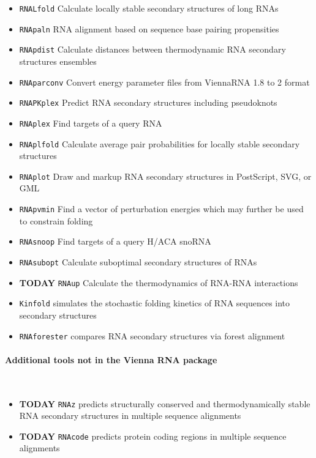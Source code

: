 \documentclass[]{article}
\let\oldparagraph\paragraph
\renewcommand{\paragraph}[1]{\oldparagraph{#1}\mbox{}}
\begin{document}
\begin{itemize}
\item \texttt{RNALfold} Calculate locally stable secondary structures of long RNAs\\
\item \texttt{RNApaln} RNA alignment based on sequence base pairing propensities\\
\item \texttt{RNApdist} Calculate distances between thermodynamic RNA secondary structures ensembles\\
\item \texttt{RNAparconv} Convert energy parameter files from ViennaRNA 1.8 to 2 format\\
\item \texttt{RNAPKplex} Predict RNA secondary structures including pseudoknots\\
\item \texttt{RNAplex} Find targets of a query RNA\\
\item \texttt{RNAplfold} Calculate average pair probabilities for locally stable secondary structures\\
\item \texttt{RNAplot} Draw and markup RNA secondary structures in PostScript, SVG, or GML\\
\item \texttt{RNApvmin} Find a vector of perturbation energies which may further be used to constrain folding\\
\item \texttt{RNAsnoop} Find targets of a query H/ACA snoRNA\\
\item \texttt{RNAsubopt} Calculate suboptimal secondary structures of RNAs\\
\item  {\bf TODAY} \texttt{RNAup} Calculate the thermodynamics of RNA-RNA interactions\\
\item \texttt{Kinfold} simulates the stochastic folding kinetics of RNA sequences into secondary structures \\
\item \texttt{RNAforester} compares RNA secondary structures via forest alignment\\
\end{itemize}

\paragraph{Additional tools not in the Vienna RNA package}\\
\begin{itemize}
\item {\bf TODAY} \texttt{RNAz} predicts structurally conserved and thermodynamically stable RNA secondary structures in multiple sequence alignments \\
\item {\bf TODAY} \texttt{RNAcode} predicts protein coding regions in multiple sequence alignments \\

\end{itemize}
\end{document}
